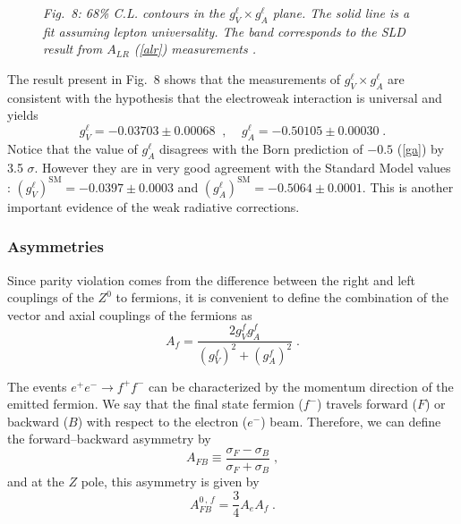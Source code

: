 \documentclass[12pt]{report}
\def\text#1{{\scriptstyle\mathrm{#1}}}
\begin{document}
\begin{figure}[ht]
\protect
\epsfxsize=10cm
\begin{center}
\mbox{}
\end{center}
\begin{center}
\begin{minipage}[ht]{12cm}
\begin{center}
{\it Fig.\ 8: 68\% C.L. contours in the $g_V^\ell \times g_A^\ell$
plane. The solid line is a fit assuming lepton universality. The band
corresponds to the SLD result from $A_{LR}$ (\ref{alr}) measurements 
\cite{LepSite}.}
\end{center}
\end{minipage}
\end{center}
\end{figure}

The result present in Fig.\ 8 shows that the measurements of
$g_V^\ell \times g_A^\ell$ are consistent with the hypothesis that the
electroweak interaction is universal and yields
\[
g_V^\ell = -0.03703 \pm 0.00068 \;\; , \;\;\;\;
g_A^\ell = -0.50105 \pm 0.00030 \; .
\]
Notice that the value of $g_A^\ell$ disagrees with the Born
prediction of $-0.5$ (\ref{ga}) by 3.5 $\sigma$. However they are  in
very good agreement with the Standard Model values \cite{pdg:98}: 
$(g_V^\ell)^{\text{SM}} = -0.0397 \pm 0.0003$ and
$(g_A^\ell)^{\text{SM}} = -0.5064 \pm 0.0001$.
This is another important evidence of the weak radiative corrections.


\subsubsection{Asymmetries} \indent

Since parity violation comes from the difference between the right
and left couplings of the $Z^0$ to fermions, it is convenient to
define the combination of the vector and axial  couplings of the
fermions as
\begin{equation}
A_f = \frac{2 g_V^f g_A^f}{(g_V^f)^2 + (g_A^f)^2} \; .
\label{af}
\end{equation}

The events $e^+ e^- \to f^+ f^-$ can be characterized by 
the momentum  direction of the emitted fermion. We say that the final
state fermion ($f^-$) travels forward ($F$) or backward ($B$) with
respect to the electron ($e^-$) beam. Therefore, we can define the
forward--backward  asymmetry by
\[
{A_{FB}} \equiv \frac{\sigma_F - \sigma_B}{\sigma_F + \sigma_B} \; ,
\]
and at the $Z$ pole, this asymmetry is given by
\begin{equation}
A_{FB}^{0\, , \, f} = \frac{3}{4} A_e A_f \; .
\label{afb}
\end{equation}
\end{document}
